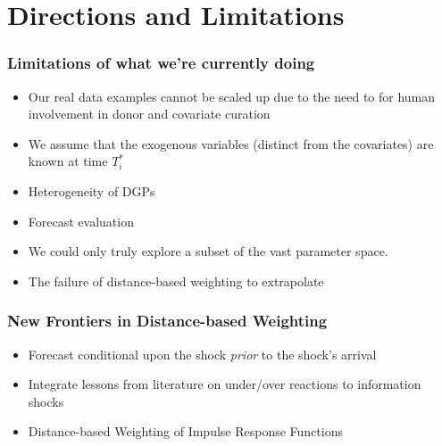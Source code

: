\documentclass[9pt]{beamer}
\theoremstyle{definition}
\begin{document}
        
        
        


\section{Directions and Limitations}

\begin{frame}
    \frametitle{Limitations of what we're currently doing}
    \begin{itemize}
        \item Our real data examples cannot be scaled up due to the need to for human involvement in donor and covariate curation
        \item We assume that the exogenous variables (distinct from the covariates) are known at time $T_{i}^{*}$
        \item Heterogeneity of DGPs
        \item Forecast evaluation
        \item We could only truly explore a subset of the vast parameter space.
        \item The failure of distance-based weighting to extrapolate
    \end{itemize}
\end{frame}

\begin{frame}
    \frametitle{New Frontiers in Distance-based Weighting}
    \begin{itemize}
        \item Forecast conditional upon the shock \textit{prior} to the shock's arrival
        \item Integrate lessons from literature on under/over reactions to information shocks \parencite[][]{jiang2017information}
        \item{Distance-based Weighting of Impulse Response Functions}
        \end{itemize}
\end{frame}
\end{document}
